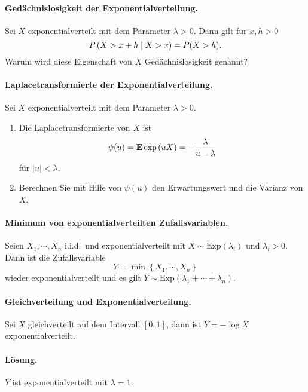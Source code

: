 \paragraph{Gedächnislosigkeit der Exponentialverteilung.}
Sei $X$ exponentialverteilt mit dem Parameter $\lambda>0$. Dann gilt für
$x,h>0$ 
\begin{equation}
    P\left( X > x+h \;\middle\vert\; X > x \right) = P( X > h).
\end{equation}
Warum wird diese Eigenschaft von $X$ Gedächnislosigkeit genannt?

\paragraph{Laplacetransformierte der Exponentialverteilung. }
Sei $X$ exponentialverteilt mit dem Parameter $\lambda>0$. 
\begin{enumerate}
    \item Die Laplacetransformierte von $X$ ist 
        \begin{equation*}
            \psi (u) = \mathbf{E} \exp \left( u X \right) = - \frac{\lambda}{u - \lambda}
        \end{equation*}
        für $|u| < \lambda$. 
    \item Berechnen Sie mit Hilfe von $\psi(u)$ den Erwartungswert und die Varianz von $X$. 
\end{enumerate}

\paragraph{Minimum von exponentialverteilten Zufallsvariablen.}
Seien $X_1, \cdots, X_n$ i.i.d.\ und exponentialverteilt mit $X\sim \text{Exp}(\lambda_i)$
und $\lambda_i>0$. Dann ist die Zufallsvariable 
\begin{equation*}
    Y = \min \left\{ X_1, \cdots, X_n \right\} 
\end{equation*}
wieder exponentialverteilt und es gilt $Y \sim
\text{Exp}(\lambda_1+\cdots+\lambda_n)$.

\paragraph{Gleichverteilung und Exponentialverteilung. } Sei $X$ gleichverteilt
auf dem Intervall $[0,1]$, dann ist $Y = -\log X$ exponentialverteilt.

\paragraph*{Lösung. } $Y$ ist exponentialverteilt mit $\lambda=1$.


